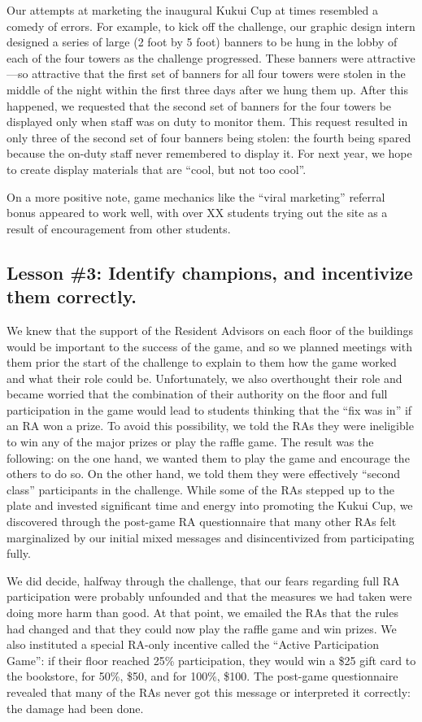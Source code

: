 \documentclass{acm_proc_article-sp}
\begin{document}
Our attempts at marketing the inaugural Kukui Cup at times resembled a
comedy of errors. For example, to kick off the challenge, our graphic
design intern designed a series of large (2 foot by 5 foot) banners to be
hung in the lobby of each of the four towers as the challenge progressed.
These banners were attractive---so attractive that the first set of banners
for all four towers were stolen in the middle of the night within the first
three days after we hung them up.  After this happened, we requested that
the second set of banners for the four towers be displayed only when staff
was on duty to monitor them.  This request resulted in only three of the
second set of four banners being stolen: the fourth being spared because
the on-duty staff never remembered to display it.  For next year, we hope
to create display materials that are ``cool, but not too cool''.

On a more positive note, game mechanics like the ``viral marketing''
referral bonus appeared to work well, with over XX students trying out the
site as a result of encouragement from other students. 

\subsection{Lesson \#3: Identify champions, and incentivize them correctly.}

We knew that the support of the Resident Advisors on each floor of the buildings would be important to the success of the game, and so we planned meetings with them prior the start of the challenge to explain to them how the game worked and what their role could be.  Unfortunately, we also overthought their role and became worried that the combination of their authority on the floor and full participation in the game would lead to students thinking that the ``fix was in'' if an RA won a prize.  To avoid this possibility, we told the RAs they were ineligible to win any of the major prizes or play the raffle game.  The result was the following: on the one hand, we wanted them to play the game and encourage the others to do so.  On the other hand, we told them they were effectively ``second class'' participants in the challenge.  While some of the RAs stepped up to the plate and invested significant time and energy into promoting the Kukui Cup, we discovered through the post-game RA questionnaire that many other RAs felt marginalized by our initial mixed messages and disincentivized from participating fully.

We did decide, halfway through the challenge, that our fears regarding full RA participation were probably unfounded and that the measures we had taken were doing more harm than good.  At that point, we emailed the RAs that the rules had changed and that they could now play the raffle game and win prizes.  We also instituted a special RA-only incentive called the ``Active Participation Game'':   if their floor reached 25\% participation, they would win a \$25 gift card to the bookstore, for 50\%, \$50, and for 100\%, \$100.   The post-game questionnaire revealed that many of the RAs never got this message or interpreted it correctly: the damage had been done.
\end{document}
